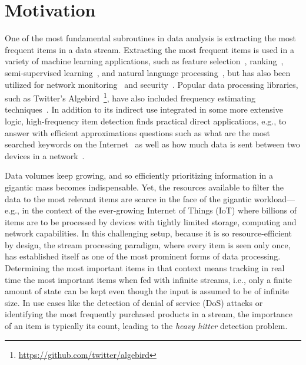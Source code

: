 

\section{Motivation}

One of the most fundamental subroutines in data analysis is extracting the most frequent items in a data stream. Extracting the most frequent items is used in a variety of machine learning applications, such as feature selection~\cite{thoma2009near}, ranking~\cite{popescu2011text}, semi-supervised learning~\cite{ahmed2015semi}, and natural language processing~\cite{chowdhury2003natural}, but has also been utilized for network monitoring~\cite{li2010mining} and security~\cite{paredes2010automating}. Popular data processing libraries, such as Twitter's Algebird~\footnote{\url{https://github.com/twitter/algebird}}, have also included frequency estimating techniques~\cite{deng2007new}. In addition to its indirect use integrated in some more extensive logic, high-frequency item detection finds practical direct applications, e.g., to answer with efficient approximations  questions such as what are the most searched keywords on the Internet~\cite{rovetta2020covid} as well as how much data is sent between two devices in a network~\cite{mistry2016network}.

Data volumes keep growing, and so efficiently prioritizing information in a gigantic mass becomes indispensable. Yet, the resources available to filter the data to the most relevant items are scarce in the face of the gigantic workload---e.g., in the context of the ever-growing Internet of Things (IoT) where billions of items are to be processed by devices with tightly limited storage, computing and network capabilities.
% 
In this challenging setup, because it is so resource-efficient by design, the stream processing paradigm, where every item is seen only once, has established itself as one of the most prominent forms of data processing. Determining the most important items in that context means tracking in real time the most important items when fed with infinite streams, i.e., only a finite amount of state can be kept even though the input is assumed to be of infinite size.
% 
In use cases like the detection of denial of service (DoS) attacks or identifying the most frequently purchased products in a stream, the importance of an item is typically its count, leading to the \emph{heavy hitter} detection problem.

